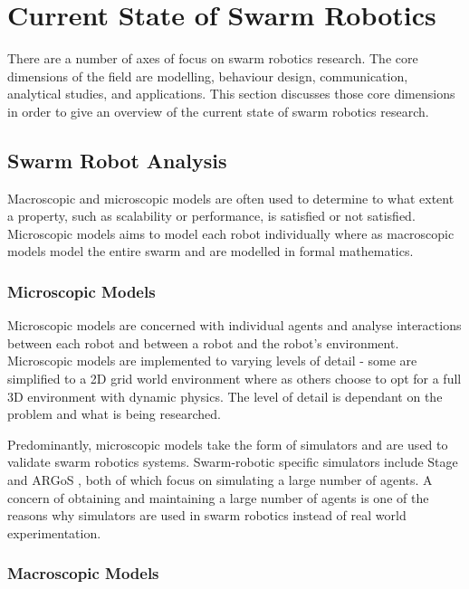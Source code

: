 \section{Current State of Swarm Robotics}
\label{currentstate}

There are a number of axes of focus on swarm robotics research. The core dimensions of the field are modelling, behaviour design, communication, analytical studies, and applications. This section discusses those core dimensions in order to give an overview of the current state of swarm robotics research. 

\subsection{Swarm Robot Analysis}
Macroscopic and microscopic models are often used to determine to what extent a property, such as scalability or performance, is satisfied or not satisfied. Microscopic models aims to model each robot individually where as macroscopic models model the entire swarm and are modelled in formal mathematics.

\subsubsection{Microscopic Models}
\label{microscopicmodels}

Microscopic models are concerned with individual agents and analyse interactions between each robot and between a robot and the robot's environment. Microscopic models are implemented to varying levels of detail - some are simplified to a 2D grid world environment where as others choose to opt for a full 3D environment with dynamic physics. The level of detail is dependant on the problem and what is being researched.

Predominantly, microscopic models take the form of simulators and are used to validate swarm robotics systems. Swarm-robotic specific simulators include Stage \cite{vaughan2008massively} and ARGoS \cite{pinciroli2011argos}, both of which focus on simulating a large number of agents. A concern of obtaining and maintaining a large number of agents is one of the reasons why simulators are used in swarm robotics instead of real world experimentation.

\subsubsection{Macroscopic Models}
\label{macroscopicmodels}

